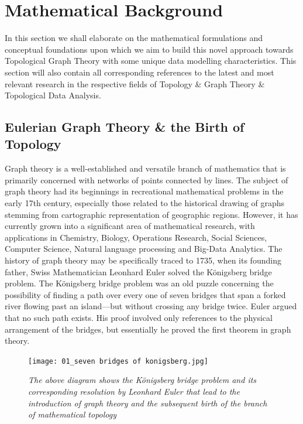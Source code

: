 \section{Mathematical Background}

In this section we shall elaborate on the mathematical formulations and conceptual foundations upon which we aim to build this novel approach towards Topological Graph Theory with some unique data modelling characteristics. This section will also contain all corresponding references to the latest and most relevant research in the respective fields of Topology \& Graph Theory \& Topological Data Analysis. 

\subsection{Eulerian Graph Theory \& the Birth of Topology}


Graph theory is a well-established and versatile branch of mathematics that is primarily concerned with networks of points connected by lines. The subject of graph theory had its beginnings in recreational mathematical problems in the early 17th century, especially those related to the historical drawing of graphs stemming from cartographic representation of geographic regions. \cite{01.10_2001HistoryofGT} However, it has currently grown into a significant area of mathematical research, with applications in Chemistry, Biology, Operations Research, Social Sciences, Computer Science, Natural language processing \cite{22.0_2015_NLPGraphs} and Big-Data Analytics.\cite{22.1_BigDataPredictionGT} \cite{22.2_GTapplicationBigData} The history of graph theory may be specifically traced to 1735, when its founding father, Swiss Mathematician Leonhard Euler solved the Königsberg bridge problem. \cite{01.13_GTBackground}The Königsberg bridge problem was an old puzzle concerning the possibility of finding a path over every one of seven bridges that span a forked river flowing past an island—but without crossing any bridge twice. Euler argued that no such path exists. His proof involved only references to the physical arrangement of the bridges, but essentially he proved the first theorem in graph theory.\cite{01.11_1999historyofTopo}

\begin{figure}[H]
	\centering
	\texttt{[image: 01\_seven bridges of konigsberg.jpg]}
	\caption{\textit{The above diagram shows the Königsberg bridge problem and its corresponding resolution by Leonhard Euler that lead to the introduction of graph theory and the subsequent birth of the branch of mathematical topology}}
	\label{fig:fig1}
\end{figure}

